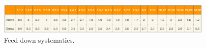 \begin{figure}[tb]
\begin{center}
 \includegraphics[width=0.95\textwidth]{figures/Dstar/pp13TeV/prompt-fraction.png}
\caption{Feed-down systematics.}
\label{fig:Dstarfeeddown_cent}
\end{center}
\end{figure}



